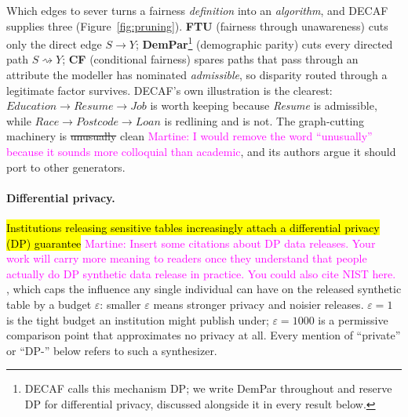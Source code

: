 \documentclass{article}
\newcommand{\martine}[1]{\textcolor{magenta}{Martine: #1}}
\begin{document}
Which edges to sever turns a fairness \emph{definition} into an
\emph{algorithm}, and DECAF supplies three (Figure~\ref{fig:pruning}).
\textbf{FTU} (fairness through unawareness) cuts only the direct edge $S
\rightarrow Y$; \textbf{DemPar}\footnote{DECAF calls this mechanism DP; we
write DemPar throughout and reserve DP for differential privacy, discussed
alongside it in every result below.} (demographic parity) cuts every directed
path $S \rightsquigarrow Y$; \textbf{CF} (conditional fairness) spares paths
that pass through an attribute the modeller has nominated \emph{admissible},
so disparity routed through a legitimate factor survives. DECAF's own
illustration is the clearest: $\textit{Education} \rightarrow \textit{Resume}
\rightarrow \textit{Job}$ is worth keeping because \textit{Resume} is
admissible, while $\textit{Race} \rightarrow \textit{Postcode} \rightarrow
\textit{Loan}$ is redlining and is not. The graph-cutting machinery is
\st{unusually} clean \martine{I would remove the word ``unusually'' because it sounds more colloquial than academic}, and its authors argue it should port to other generators.

\paragraph{Differential privacy.}
\hl{Institutions releasing sensitive tables increasingly attach a differential
privacy (DP) guarantee} \martine{Insert some citations about DP data releases. Your work will carry more meaning to readers once they understand that people actually do DP synthetic data release in practice. You could also cite NIST here.} \citep{dwork2006calibrating}, which caps the
influence any single individual can have on the released synthetic table by
a budget $\varepsilon$: smaller $\varepsilon$ means stronger privacy and
noisier releases. $\varepsilon{=}1$ is the tight budget an institution might
publish under; $\varepsilon{=}1000$ is a permissive comparison point that
approximates no privacy at all. Every mention of ``private'' or ``DP-''
below refers to such a synthesizer.
\end{document}
